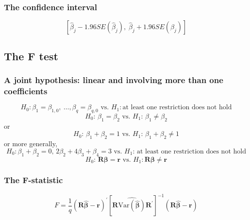 \documentclass[a4paper,10pt]{article}
\newcommand{\var}{\mathrm{Var}}
\begin{document}
\subsubsection*{The confidence interval}
\label{sec:org2be9693}
\[ \left[\hat{\beta}_j - 1.96 SE(\hat{\beta}_j),\; \hat{\beta}_j +
1.96 SE(\hat{\beta}_j)\right] \]

\subsection{The F test}
\label{sec:org957796b}
\subsubsection*{A joint hypothesis: linear and involving more than one coefficients}
\label{sec:org09e5530}
\begin{equation}
\label{eq:jnt-hypo-1}
H_0: \beta_1 = \beta_{1,0},\ \ldots, \beta_q = \beta_{q,0} \text{ vs. } H_1: \text{at least one restriction does not hold}
\end{equation} 
\begin{equation}
\label{eq:jnt-hyp-2}
H_0:\, \beta_1 = \beta_2 \text{ vs. } H_1:\, \beta_1 \neq \beta_2
\end{equation}
or
\begin{equation}
\label{eq:jnt-hyp-3}
H_0:\, \beta_1 + \beta_2 = 1 \text{ vs. } H_1:\, \beta_1 + \beta_2 \neq 1
\end{equation}
or more generally, 
\begin{equation}
\label{eq:jnt-hyp-4}
H_0: \beta_1 + \beta_2 = 0,\, 2\beta_2 + 4\beta_3 + \beta_4 = 3 \text{ vs. } H_1:\, \text{at least one restriction does not hold}
\end{equation}
\begin{equation}
\label{eq:jnt-hyp-g}
H_0:\, \mathbf{R}\boldsymbol{\beta} = \mathbf{r} \text{ vs. } H_1: \mathbf{R}\boldsymbol{\beta} \neq \mathbf{r}
\end{equation}

\subsubsection*{The F-statistic}
\label{sec:org0c49b94}
\begin{equation}
\label{eq:ftest-gen}
F = \frac{1}{q}(\mathbf{R}\hat{\boldsymbol{\beta}} - \mathbf{r})^{\prime} \left[ \mathbf{R} \widehat{\var(\hat{\boldsymbol{\beta}})} \mathbf{R}^{\prime} \right]^{-1} (\mathbf{R}\hat{\boldsymbol{\beta}} - \mathbf{r})
\end{equation}
\end{document}
